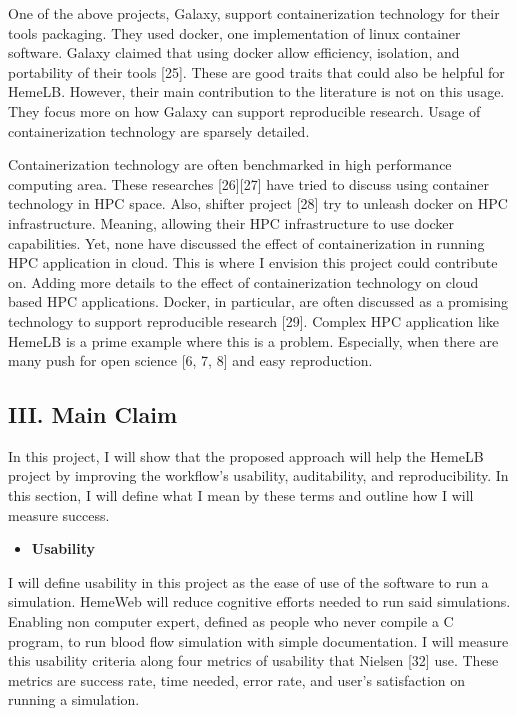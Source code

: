 \documentclass[]{article}
\providecommand{\tightlist}{%
  \setlength{\itemsep}{0pt}\setlength{\parskip}{0pt}}
\begin{document}
One of the above projects, Galaxy, support containerization technology
for their tools packaging. They used docker, one implementation of linux
container software. Galaxy claimed that using docker allow efficiency,
isolation, and portability of their tools {[}25{]}. These are good
traits that could also be helpful for HemeLB. However, their main
contribution to the literature is not on this usage. They focus more on
how Galaxy can support reproducible research. Usage of containerization
technology are sparsely detailed.

Containerization technology are often benchmarked in high performance
computing area. These researches {[}26{]}{[}27{]} have tried to discuss
using container technology in HPC space. Also, shifter project {[}28{]}
try to unleash docker on HPC infrastructure. Meaning, allowing their HPC
infrastructure to use docker capabilities. Yet, none have discussed the
effect of containerization in running HPC application in cloud. This is
where I envision this project could contribute on. Adding more details
to the effect of containerization technology on cloud based HPC
applications. Docker, in particular, are often discussed as a promising
technology to support reproducible research {[}29{]}. Complex HPC
application like HemeLB is a prime example where this is a problem.
Especially, when there are many push for open science {[}6, 7, 8{]} and
easy reproduction.

\subsection{III. Main Claim}\label{iii.-main-claim}

In this project, I will show that the proposed approach will help the
HemeLB project by improving the workflow's usability, auditability, and
reproducibility. In this section, I will define what I mean by these
terms and outline how I will measure success.

\begin{itemize}
\tightlist
\item
  \textbf{Usability}
\end{itemize}

I will define usability in this project as the ease of use of the
software to run a simulation. HemeWeb will reduce cognitive efforts
needed to run said simulations. Enabling non computer expert, defined as
people who never compile a C program, to run blood flow simulation with
simple documentation. I will measure this usability criteria along four
metrics of usability that Nielsen {[}32{]} use. These metrics are
success rate, time needed, error rate, and user's satisfaction on
running a simulation.
\end{document}
